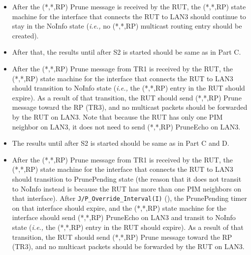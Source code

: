 \documentclass[11pt]{report}
\newcommand{\ie}{\emph{i.e.,}\xspace}
\begin{document}

\begin{itemize}

  \item After the (*,*,RP) Prune message is received by the RUT,
  the (*,*,RP) state machine for the interface that connects the RUT to
  LAN3 should continue to stay in the NoInfo state (\ie no (*,*,RP) multicast
  routing entry should be created).

  \item After that, the results until after S2 is started should be same as in
  Part C.

  \item After the (*,*,RP) Prune message from TR1 is received by the RUT,
  the (*,*,RP) state machine for the interface that connects the RUT to
  LAN3 should transition to NoInfo state
  (\ie the (*,*,RP) entry in the RUT should expire).
  As a result of that transition, the RUT should send (*,*,RP) Prune
  message toward the RP (TR3), and no multicast packets should be
  forwarded by the RUT on LAN3. Note that because the RUT has only one
  PIM neighbor on LAN3, it does not need to send (*,*,RP) PruneEcho on
  LAN3.

\end{itemize}


\begin{itemize}

  \item The results until after S2 is started should be same as in
  Part C and D.

  \item After the (*,*,RP) Prune message from TR1 is received by the RUT,
  the (*,*,RP) state machine for the interface that connects the RUT to
  LAN3 should transition to PrunePending state (the reason that it does
  not transit to NoInfo instead is because the RUT has more than one PIM
  neighbors on that interface).
  After \verb=J/P_Override_Interval(I)= (\PimsmJPOverrideIntervalI),
  the PrunePending timer on that interface should expire, and the
  (*,*,RP) state machine for the interface should send (*,*,RP) PruneEcho
  on LAN3 and transit to NoInfo
  state (\ie the (*,*,RP) entry in the RUT should expire).
  As a result of that transition, the RUT should send (*,*,RP) Prune
  message toward the RP (TR3), and no multicast packets should be
  forwarded by the RUT on LAN3.

\end{itemize}
\end{document}

